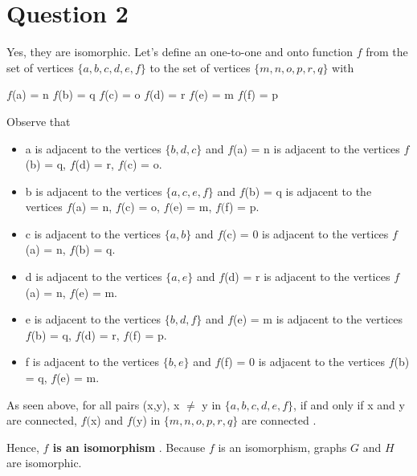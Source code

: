 \documentclass[11pt]{article}
\begin{document}
\newpage
\section*{Question 2}
\noindent Yes, they are isomorphic. \newline \newline
\noindent Let's define an one-to-one and onto function $f$ from the set of vertices $\{a,b,c,d,e,f\}$ to the set of vertices $\{m,n,o,p,r,q\}$ with \newline 

\noindent $f$(a) = n \newline
$f$(b) = q \newline
$f$(c) = o \newline
$f$(d) = r \newline
$f$(e) = m \newline
$f$(f) = p \newline \newline

\noindent Observe that

\begin{itemize}
    \item a is adjacent to the vertices $\{b,d,c\}$ and $f$(a) = n is adjacent to the vertices $f$(b) = q, $f$(d) = r, $f($c) = o.
    \item b is adjacent to the vertices $\{a,c,e,f\}$ and $f$(b) = q is adjacent to the vertices $f$(a) = n, $f$(c) = o, $f($e) = m, $f($f) = p.
    \item c is adjacent to the vertices $\{a,b\}$ and $f$(c) = 0 is adjacent to the vertices $f$(a) = n, $f$(b) = q.
    \item d is adjacent to the vertices $\{a,e\}$ and $f$(d) = r is adjacent to the vertices $f$(a) = n, $f$(e) = m.
    \item e is adjacent to the vertices $\{b,d,f\}$ and $f$(e) = m is adjacent to the vertices $f$(b) = q, $f$(d) = r, $f($f) = p.
    \item f is adjacent to the vertices $\{b,e\}$ and $f$(f) = 0 is adjacent to the vertices $f$(b) = q, $f$(e) = m.
\end{itemize}

\noindent As seen above, for all pairs (x,y), x $\neq$ y in $\{a,b,c,d,e,f\}$, if and only if x and y are connected, $f($x) and $f($y) in $\{m,n,o,p,r,q\}$ are connected . \newline

\noindent Hence, \textbf{$f$ is an isomorphism} . \noindent
\newline \newline
Because $f$ is an isomorphism, graphs $G$ and $H$ are isomorphic.
\end{document}
